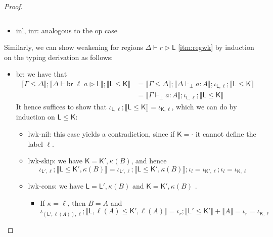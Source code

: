 \documentclass[acmsmall,screen,review]{acmart}
\newcommand{\ms}[1]{\ensuremath{\mathsf{#1}}}
\newcommand{\brb}[2]{\ms{br}\;#1\;#2}
\newcommand{\hasty}[4]{#1 \vdash_{#2} #3: {#4}}
\newcommand{\haslb}[3]{#1 \vdash #2 \rhd #3}
\newcommand{\brle}[1]{{\textsf{#1}}}
\newcommand{\dnt}[1]{\llbracket{#1}\rrbracket}
\begin{document}
\begin{proof}
\begin{itemize}
\begin{equation}
    \end{equation}
    \item \brle{inl}, \brle{inr}: analogous to the \brle{op} case
  \end{itemize}
  Similarly, we can show weakening for regions $\haslb{\Delta}{r}{\ms{L}}$ \ref{itm:regwk} by
  induction on the typing derivation as follows:
  \begin{itemize}
    \item \brle{br}: we have that
    \begin{equation}
      \begin{aligned}
      \dnt{\Gamma \leq \Delta}
        ; \dnt{\haslb{\Delta}{\brb{\ell}{a}}{\ms{L}}}
        ; \dnt{\ms{L} \leq \ms{K}}
      & = \dnt{\Gamma \leq \Delta} 
        ; \dnt{\hasty{\Delta}{\bot}{a}{A}}
        ; \iota_{\ms{L}, \ell}
        ; \dnt{\ms{L} \leq \ms{K}} \\
      & = \dnt{\hasty{\Gamma}{\bot}{a}{A}}
        ; \iota_{\ms{L}, \ell}
        ; \dnt{\ms{L} \leq \ms{K}}
      \end{aligned}
    \end{equation}
    It hence suffices to show that 
    $\iota_{\ms{L}, \ell} ; \dnt{\ms{L} \leq \ms{K}} = \iota_{\ms{K}, \ell}$, which we can do by
    induction on $\ms{L} \leq \ms{K}$:
    \begin{itemize}
      \item \brle{lwk-nil}: this case yields a contradiction, since if $\ms{K} = \cdot$ it cannot
      define the label $\ell$.
      \item \brle{lwk-skip}: we have $\ms{K} = \ms{K}', \kappa(B)$, and hence
      \begin{equation}
        \iota_{\ms{L}', \ell} ; \dnt{\ms{L} \leq \ms{K}', \kappa(B)}
        = \iota_{\ms{L}', \ell} ; \dnt{\ms{L} \leq \ms{K}', \kappa(B)} ; \iota_l
        = \iota_{\ms{K}', \ell} ; \iota_l
        = \iota_{\ms{K}, \ell}
      \end{equation}
      \item \brle{lwk-cons}: we have $\ms{L} = \ms{L}', \kappa(B)$ and $\ms{K} = \ms{K}', \kappa(B)$
      .
      \begin{itemize}
        \item If $\kappa = \ell$, then $B = A$ and
        \begin{equation}
          \iota_{(\ms{L}', \ell(A)), \ell} 
          ; \dnt{\ms{L}, \ell(A) \leq \ms{K}', \ell(A)}
          = \iota_r ; \dnt{\ms{L}' \leq \ms{K}'} + \dnt{A}
          = \iota_r
           = \iota_{\ms{K}, \ell}

\end{equation}
\end{itemize}
\end{itemize}
\end{itemize}
\end{proof}
\end{document}
